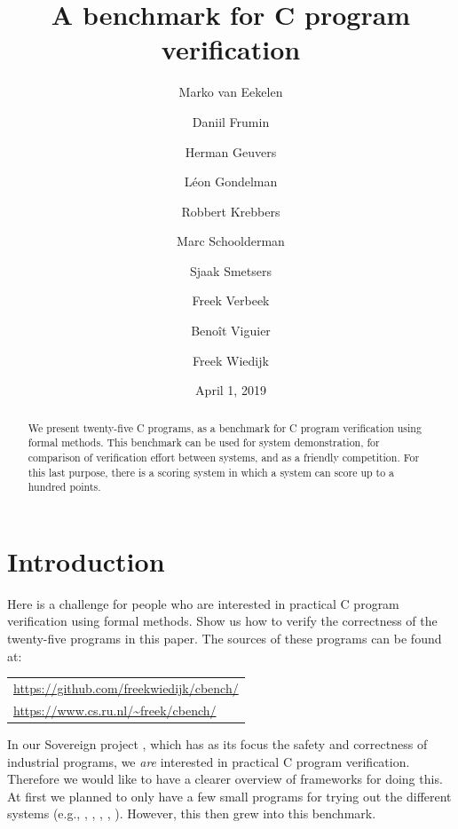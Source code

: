 \documentclass{article}
\begin{document}
\title{A benchmark for C program verification}
\author{%
Marko van Eekelen \and
Daniil Frumin \and
Herman Geuvers \and
L\'eon Gondelman \and
Robbert Krebbers \and
Marc Schoolderman \and
Sjaak Smetsers \and
Freek Verbeek \and
Beno\^it Viguier \and
Freek Wiedijk
}
\date{April 1, 2019}
\maketitle

\begin{abstract}
\noindent
We present twenty-five C programs, as a benchmark for
C program verification using formal methods.
%
This benchmark can be used for system demonstration,
for comparison of verification effort between systems,
and as a friendly competition.
For this last purpose, there is a scoring system in which
a system can score up to a hundred points.
\end{abstract}

\section{Introduction}

Here is a challenge for people who are interested in practical C program verification using formal methods.
Show us how to verify the correctness of the twenty-five programs in this paper.
The sources of these programs can be found at:
\begin{center}
\begin{tabular}{l}
\url{https://github.com/freekwiedijk/cbench/} \\
\url{https://www.cs.ru.nl/~freek/cbench/}
\end{tabular}
\end{center}
In our Sovereign project \cite{eek:geu:sme:wie:14}, which has as its focus the safety and correctness of industrial programs, we \emph{are} interested in practical C program verification.
Therefore we would like to have a clearer overview of frameworks for doing this.
At first we planned to only have a few small programs for trying out the different systems (e.g., \cite{app:11}, \cite{cor:cuo:kir:mar:pre:puc:sig:yak:18}, \cite{dah:mos:san:tob:sch:09}, \cite{gre:and:klei:12}, \cite{jac:sma:phi:vog:pen:pie:11}).
However, this then grew into this benchmark.
\end{document}
